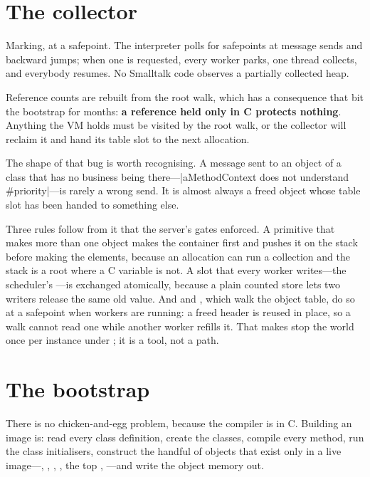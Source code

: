 \section{The collector}

Marking, at a safepoint. The interpreter polls for safepoints at message sends
and backward jumps; when one is requested, every worker parks, one thread
collects, and everybody resumes. No Smalltalk code observes a partially
collected heap.

Reference counts are rebuilt from the root walk, which has a consequence that
bit the bootstrap for months: \textbf{a reference held only in C protects
nothing}. Anything the VM holds must be visited by the root walk, or the
collector will reclaim it and hand its table slot to the next allocation.

The shape of that bug is worth recognising. A message sent to an object of a
class that has no business being there---\ct|aMethodContext does not understand #priority|---is rarely a wrong send. It is almost always a freed
object whose table slot has been handed to something else.

Three rules follow from it that the server's gates enforced. A primitive
that makes more than one object makes the container first and pushes it on
the stack before making the elements, because an allocation can run a
collection and the stack is a root where a C variable is not. A slot that
every worker writes---the scheduler's ---is exchanged
atomically, because a plain counted store lets two writers release the same
old value. And  and , which walk the
object table, do so at a safepoint when workers are running: a freed header
is reused in place, so a walk cannot read one while another worker refills
it. That makes  stop the world once per instance under
; it is a tool, not a path.

\section{The bootstrap}

There is no chicken-and-egg problem, because the compiler is in C. Building an
image is: read every class definition, create the classes, compile every
method, run the class initialisers, construct the handful of objects that
exist only in a live image---, ,
, , the top , ---and write
the object memory out.

